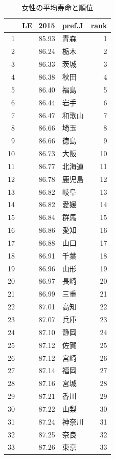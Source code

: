 \begin{table}[ht]
\caption{女性の平均寿命と順位}
\centering
\footnotesize
\begin{tabular}{rrlr}
  \hline
 & LE\_2015 & pref.J & rank \\ 
  \hline
1 & 85.93 & 青森 &   1 \\ 
  2 & 86.24 & 栃木 &   2 \\ 
  3 & 86.33 & 茨城 &   3 \\ 
  4 & 86.38 & 秋田 &   4 \\ 
  5 & 86.40 & 福島 &   5 \\ 
  6 & 86.44 & 岩手 &   6 \\ 
  7 & 86.47 & 和歌山 &   7 \\ 
  8 & 86.66 & 埼玉 &   8 \\ 
  9 & 86.66 & 徳島 &   9 \\ 
  10 & 86.73 & 大阪 &  10 \\ 
  11 & 86.77 & 北海道 &  11 \\ 
  12 & 86.78 & 鹿児島 &  12 \\ 
  13 & 86.82 & 岐阜 &  13 \\ 
  14 & 86.82 & 愛媛 &  14 \\ 
  15 & 86.84 & 群馬 &  15 \\ 
  16 & 86.86 & 愛知 &  16 \\ 
  17 & 86.88 & 山口 &  17 \\ 
  18 & 86.91 & 千葉 &  18 \\ 
  19 & 86.96 & 山形 &  19 \\ 
  20 & 86.97 & 長崎 &  20 \\ 
  21 & 86.99 & 三重 &  21 \\ 
  22 & 87.01 & 高知 &  22 \\ 
  23 & 87.07 & 兵庫 &  23 \\ 
  24 & 87.10 & 静岡 &  24 \\ 
  25 & 87.12 & 佐賀 &  25 \\ 
  26 & 87.12 & 宮崎 &  26 \\ 
  27 & 87.14 & 福岡 &  27 \\ 
  28 & 87.16 & 宮城 &  28 \\ 
  29 & 87.21 & 香川 &  29 \\ 
  30 & 87.22 & 山梨 &  30 \\ 
  31 & 87.24 & 神奈川 &  31 \\ 
  32 & 87.25 & 奈良 &  32 \\ 
  33 & 87.26 & 東京 &  33 \\ 

\end{tabular}
\end{table}
